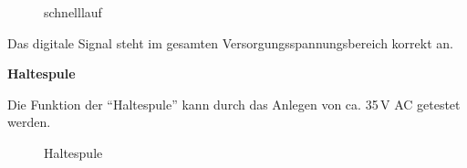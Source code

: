 \documentclass[ngerman,11pt,parskip=half] {scrartcl}
\newcommand {\tscopesize}{12cm}
\begin{document}
\begin{figure}[H]
\centering
{}
\caption{schnelllauf} \label{fig:1}
\end{figure}

Das digitale Signal steht im gesamten Versorgungsspannungsbereich korrekt an. 

\textbf{Haltespule}

Die Funktion der "`Haltespule"' kann durch das Anlegen von ca. 35\,V AC getestet werden.

\begin{figure}[H]
\centering
{}
\caption{Haltespule} \label{fig:1}
\end{figure}
\end{document}

